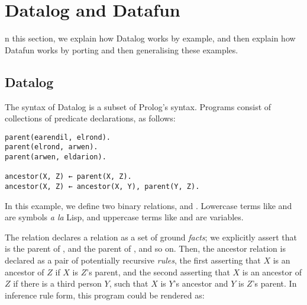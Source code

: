 \section{Datalog and Datafun}
\label{sec:datalog-and-datafun}

n this section, we explain how Datalog works by example, and then explain
how Datafun works by porting and then generalising these examples. 

\subsection{Datalog}

The syntax of Datalog is a subset of Prolog's syntax. Programs
consist of collections of predicate declarations, as follows:
\begin{verbatim}
parent(earendil, elrond).
parent(elrond, arwen).
parent(arwen, eldarion).

ancestor(X, Z) ← parent(X, Z).
ancestor(X, Z) ← ancestor(X, Y), parent(Y, Z).
\end{verbatim}

In this example, we define two binary relations, 
and . Lowercase terms like  and
 are symbols \emph{a la} Lisp, and uppercase terms like
 and  are variables.

The  relation declares a relation as a set of
ground \emph{facts}; we explicitly assert that  is
the parent of , and  the parent of
, and so on. Then, the ancestor relation is declared as
a pair of potentially recursive \emph{rules}, the first asserting that
$X$ is an ancestor of $Z$ if $X$ is $Z$'s parent, and the second
asserting that $X$ is an ancestor of $Z$ if there is a third person
$Y$, such that $X$ is $Y$'s ancestor and $Y$ is $Z$'s parent. In
inference rule form, this program could be rendered as:


